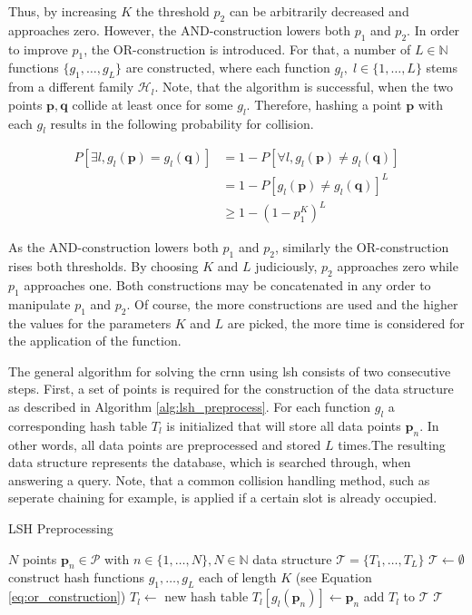 \documentclass[../../../main.tex]{subfiles}
\begin{document}
Thus, by increasing $K$ the threshold $p_2$ can be arbitrarily decreased and approaches zero. However, the AND-construction lowers both $p_1$ and $p_2$. In order to improve $p_1$, the OR-construction is introduced. For that, a number of $L \in \mathbb{N}$ functions $\{g_1, \dots, g_L\}$ are constructed, where each function $g_l, \; l \in \{1, \dots, L\}$ stems from a different family $\mathcal{H}_l$. Note, that the algorithm is successful, when the two points $\bm{p}, \bm{q}$ collide at least once for some $g_l$. Therefore, hashing a point $\bm{p}$ with each $g_l$ results in the following probability for collision.

\begin{align*}
    P[\exists l, g_l(\bm{p})=g_l(\bm{q})] &= 1 - P[\forall l, g_l(\bm{p}) \neq g_l(\bm{q})] \\
                                &= 1 - P[g_l(\bm{p}) \neq g_l(\bm{q})]^L \\
                                &\geq 1 - (1-p_1^K)^L
\end{align*}

As the AND-construction lowers both $p_1$ and $p_2$, similarly the OR-construction rises both thresholds. By choosing $K$ and $L$ judiciously, $p_2$ approaches zero while $p_1$ approaches one. Both constructions may be concatenated in any order to manipulate $p_1$ and $p_2$. Of course, the more constructions are used and the higher the values for the parameters $K$ and $L$ are picked, the more time is considered for the application of the function. 

The general algorithm for solving the \gls{crnn} using \gls{lsh} consists of two consecutive steps. First, a set of points is required for the construction of the data structure as described in Algorithm \ref{alg:lsh_preprocess}. For each function $g_l$ a corresponding hash table $T_l$ is initialized that will store all data points $\bm{p}_n$. In other words, all data points are preprocessed and stored $L$ times.The resulting data structure represents the database, which is searched through, when answering a query. Note, that a common collision handling method, such as seperate chaining for example, is applied if a certain slot is already occupied.

\begin{algorithm}
    \caption{LSH Preprocessing}
    \label{alg:lsh_preprocess}
    \begin{algorithmic}[1]
        \REQUIRE $N$ points $\bm{p}_n \in \mathcal{P}$ with $n \in \{1, \dots, N\}, N \in \mathbb{N}$
        \ENSURE data structure $\mathcal{T} = \{T_1, \dots, T_L\}$
        \STATE $\mathcal{T} \leftarrow \emptyset$
        \STATE construct hash functions $g_1, \dots, g_L$ each of length $K$ (see Equation \ref{eq:or_construction})
            \STATE $T_l \leftarrow$ new hash table
                \STATE $T_l[g_l(\bm{p}_n)] \leftarrow \bm{p}_n$
            \ENDFOR
            \STATE add $T_l$ to $\mathcal{T}$
        \ENDFOR
        \RETURN $\mathcal{T}$
    \end{algorithmic}
 \end{algorithm}
\end{document}
